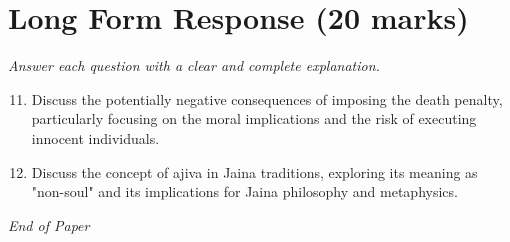 \documentclass[12pt]{article}
\begin{document}
\section*{Long Form Response (20 marks)}
\textit{Answer each question with a clear and complete explanation.}
\begin{enumerate}[label=\arabic*.]
\setcounter{enumi}{10}
\item Discuss the potentially negative consequences of imposing the death penalty, particularly focusing on the moral implications and the risk of executing innocent individuals.
\item Discuss the concept of ajiva in Jaina traditions, exploring its meaning as "non-soul" and its implications for Jaina philosophy and metaphysics.
\end{enumerate}

\vfill
\noindent\textit{End of Paper}
\end{document}
